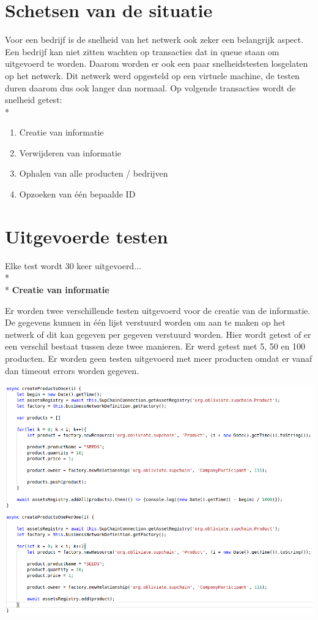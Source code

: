 \documentclass[fleqn,a4paper,12pt]{book}
\begin{document}
\section{Schetsen van de situatie}
Voor een bedrijf is de snelheid van het netwerk ook zeker een belangrijk aspect. Een bedrijf kan niet zitten wachten op transacties dat in queue staan om uitgevoerd te worden. Daarom worden er ook een paar snelheidstesten losgelaten op het netwerk. Dit netwerk werd opgesteld op een virtuele machine, de testen duren daarom dus ook langer dan normaal. Op volgende transacties wordt de snelheid getest:\\*
\begin{enumerate}
	\item Creatie van informatie
	\item Verwijderen van informatie
	\item Ophalen van alle producten / bedrijven
	\item Opzoeken van één bepaalde ID
\end{enumerate}

\section{Uitgevoerde testen}
Elke test wordt 30 keer uitgevoerd...\\*\\*
\textbf{Creatie van informatie}

Er worden twee verschillende testen uitgevoerd voor de creatie van de informatie. De gegevens kunnen in één lijst verstuurd worden om aan te maken op het netwerk of dit kan gegeven per gegeven verstuurd worden. Hier wordt getest of er een verschil bestaat tussen deze twee manieren. Er werd getest met 5, 50 en 100 producten. Er worden geen testen uitgevoerd met meer producten omdat er vanaf dan timeout errors worden gegeven.

\begin{center}
	\includegraphics[width=14cm]{img/test-function-createProductOnce}\\[1cm]
\end{center}
\end{document}
